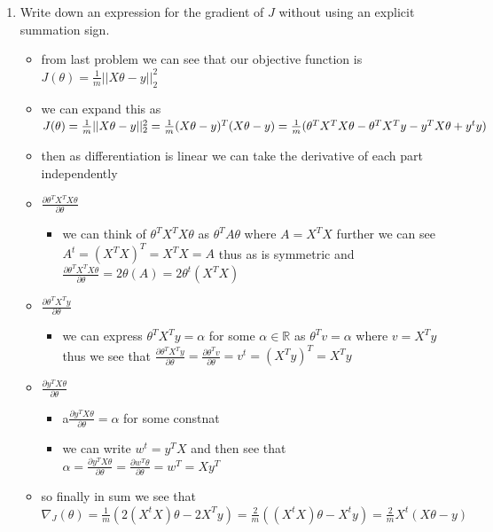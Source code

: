 \documentclass{article}
\begin{document}
\begin{enumerate}
\item Write down an expression for the gradient of $J$ without using an explicit summation sign. 
\begin{itemize}
    \item from last problem we can see that our objective function is $J(\theta)=\frac{1}{m}||X\theta -y||_{2}^{2}$ 
    \item we can expand this as $J(\theta)=\frac{1}{m}||X\theta -y||_{2}^{2}=\frac{1}{m}(X\theta -y)^{T}(X\theta -y)\\
    =\frac{1}{m}(\theta^{T}X^{T}X\theta-\theta^{T}X^{T}y-y^{T}X\theta +y^{t}y)$
    \item then as differentiation is linear we can take the derivative of each part independently
    \item $\frac{\partial \theta^{T}X^{T}X\theta}{\partial \theta}$
    \begin{itemize}
        \item we can think of $\theta^{T}X^{T}X\theta$ as $\theta^{T}A\theta$ where $A=X^{T}X$ further we can see $A^{t}=(X^{T}X)^{T}=X^{T}X=A$ thus as is symmetric and $\frac{\partial \theta^{T}X^{T}X\theta}{\partial \theta}=2\theta(A)=2\theta^{t}(X^{T}X)$ 
    \end{itemize}
    \item $\frac{\partial \theta^{T}X^{T}y}{\partial \theta}$
    \begin{itemize}
        \item we can express $\theta^{T}X^{T}y=\alpha$ for some $\alpha \in \mathbb{R}$ as $\theta^{T}v=\alpha$ where $v=X^{T}y$ thus we see that $\frac{\partial \theta^{T}X^{T}y}{\partial \theta}=\frac{\partial \theta^{T}v}{\partial \theta}=v^{t}=(X^{T}y)^{T}=X^{T}y$
    \end{itemize}
    \item $\frac{\partial y^{T}X\theta }{\partial \theta}$
    \begin{itemize}
        \item a$\frac{\partial y^{T}X\theta }{\partial \theta}=\alpha$ for some constnat 
        \item we can write $w^{t}=y^{T}X$ and then see that $\alpha=\frac{\partial y^{T}X\theta }{\partial \theta}=\frac{\partial w^{T}\theta }{\partial \theta}=w^{T}=Xy^{T}$
    \end{itemize}
    \item so finally in sum we see that $\nabla_{J}(\theta)=\frac{1}{m}(2(X^{t}X)\theta-2X^{T}y)=\frac{2}{m}((X^{t}X)\theta-X^{t}y)=\frac{2}{m}X^{t}(X\theta-y)$
\end{itemize}

\end{enumerate}
\end{document}
